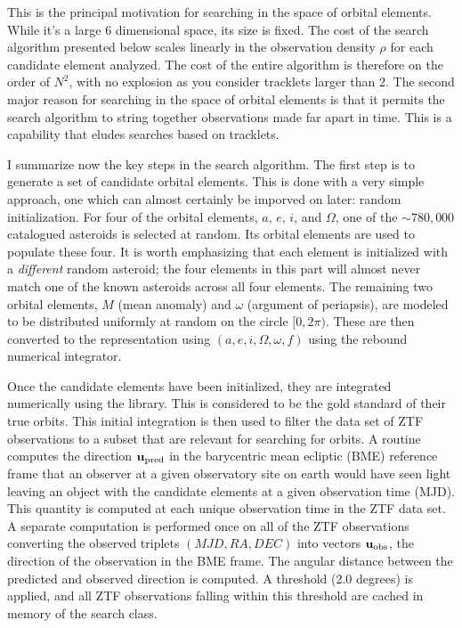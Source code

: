 This is the principal motivation for searching in the space of orbital elements.
While it's a large 6 dimensional space, its size is fixed.
The cost of the search algorithm presented below scales linearly in the observation density $\rho$ for each candidate element analyzed.
The cost of the entire algorithm is therefore on the order of $N^2$, with no explosion as you consider tracklets larger than 2.
The second major reason for searching in the space of orbital elements is that it permits the search algorithm to string together observations made far apart in time.
This is a capability that eludes searches based on tracklets.

I summarize now the key steps in the search algorithm.
The first step is to generate a set of candidate orbital elements.
This is done with a very simple approach, one which can almost certainly be imporved on later: random initialization.
For four of the orbital elements, $a$, $e$, $i$, and $\Omega$, one of the $\sim780,000$ catalogued asteroids is selected at random.
Its orbital elements are used to populate these four.
It is worth emphasizing that each element is initialized with a \textit{different} random asteroid;
the four elements in this part will almost never match one of the known asteroids across all four elements.
The remaining two orbital elements, $M$ (mean anomaly) and $\omega$ (argument of periapsis), 
are modeled to be distributed uniformly at random on the circle $[0, 2 \pi)$.
These are then converted to the representation using $(a, e, i, \Omega, \omega, f)$ using the rebound numerical integrator.

Once the candidate elements have been initialized, they are integrated numerically using the  library.
This is considered to be the gold standard of their true orbits.
This initial integration is then used to filter the data set of ZTF observations to a subset that are relevant for searching for orbits.
A routine computes the direction $\mathbf{u}_{\mathrm{pred}}$ in the barycentric mean ecliptic (BME) reference frame
that an observer at a given observatory site on earth would have seen light leaving an object with the candidate elements at a given observation time (MJD).
This quantity is computed at each unique observation time in the ZTF data set.
A separate computation is performed once on all of the ZTF observations converting the observed triplets $(MJD, RA, DEC)$
into vectors $\mathbf{u}_{\mathrm{obs}}$, the direction of the observation in the BME frame.
The angular distance between the predicted and observed direction is computed.
A threshold (2.0 degrees) is applied, and all ZTF observations falling within this threshold are cached in memory of the search class.

